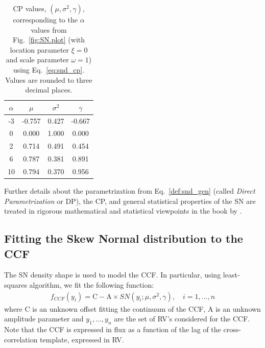 \documentclass[11pt, oneside]{article}
\begin{document}
{%
\begin{table}[htbp]
   \centering
   \begin{tabular}{|cccc|} %
\hline
$\alpha$ & $\mu$ & $\sigma^2$ & $\gamma$ \\
\hline
 -3 	&	 -0.757	&	 0.427	&	 -0.667 \\
0	&	 0.000 	&	1.000	&	 0.000 \\
2	&	 0.714	&	 0.491	&	 0.454\\
6	&	 0.787	&	 0.381	&	 0.891\\
10	&	 0.794	&	 0.370	&	 0.956\\
\hline
   \end{tabular}
   \caption{CP values, $(\mu, \sigma^2, \gamma)$, corresponding to the $\alpha$ values from Fig.~\ref{fig:SN.plot} (with location parameter $\xi = 0$ and scale parameter $\omega = 1$) using Eq.~\eqref{eq:snd_cp}.  Values are rounded to three decimal places.}
   \label{tab:cp_values}
\end{table}
%
Further details about the parametrization from Eq.~\eqref{def:snd_gen} (called \emph{Direct Parametrization} or DP), the CP, and general statistical properties of the SN are treated in rigorous mathematical and statistical viewpoints in the book by \cite{Azzalini2014}.

\subsection{Fitting the Skew Normal distribution to the CCF} \label{sec:3}

The SN density shape is used to model the CCF.  In particular, using least-squares algorithm, we fit the following function:
%
\begin{eqnarray} \label{eq:3}
f_{CCF}(y_i) = \mathrm{C} - \mathrm{A} \times SN(y_i;\mu, \sigma^2, \gamma), \quad i = 1, \ldots, n
\end{eqnarray}
%
where C is an unknown offset fitting the continuum of the CCF, A is an unknown amplitude parameter and $y_1, \ldots, y_n$ are the set of RV's considered for the CCF. Note that the CCF is expressed in flux as a function of the lag of the cross-correlation template, expressed in RV.

}
\end{document}
